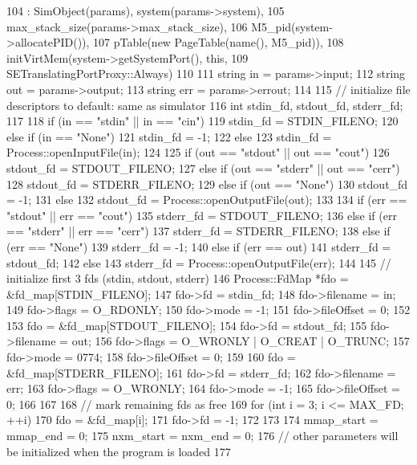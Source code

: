 \begin{DoxyCode}
104     : SimObject(params), system(params->system),
105       max_stack_size(params->max_stack_size),
106       M5_pid(system->allocatePID()),
107       pTable(new PageTable(name(), M5_pid)),
108       initVirtMem(system->getSystemPort(), this,
109                   SETranslatingPortProxy::Always)
110 {
111     string in = params->input;
112     string out = params->output;
113     string err = params->errout;
114 
115     // initialize file descriptors to default: same as simulator
116     int stdin_fd, stdout_fd, stderr_fd;
117 
118     if (in == "stdin" || in == "cin")
119         stdin_fd = STDIN_FILENO;
120     else if (in == "None")
121         stdin_fd = -1;
122     else
123         stdin_fd = Process::openInputFile(in);
124 
125     if (out == "stdout" || out == "cout")
126         stdout_fd = STDOUT_FILENO;
127     else if (out == "stderr" || out == "cerr")
128         stdout_fd = STDERR_FILENO;
129     else if (out == "None")
130         stdout_fd = -1;
131     else
132         stdout_fd = Process::openOutputFile(out);
133 
134     if (err == "stdout" || err == "cout")
135         stderr_fd = STDOUT_FILENO;
136     else if (err == "stderr" || err == "cerr")
137         stderr_fd = STDERR_FILENO;
138     else if (err == "None")
139         stderr_fd = -1;
140     else if (err == out)
141         stderr_fd = stdout_fd;
142     else
143         stderr_fd = Process::openOutputFile(err);
144 
145     // initialize first 3 fds (stdin, stdout, stderr)
146     Process::FdMap *fdo = &fd_map[STDIN_FILENO];
147     fdo->fd = stdin_fd;
148     fdo->filename = in;
149     fdo->flags = O_RDONLY;
150     fdo->mode = -1;
151     fdo->fileOffset = 0;
152 
153     fdo =  &fd_map[STDOUT_FILENO];
154     fdo->fd = stdout_fd;
155     fdo->filename = out;
156     fdo->flags =  O_WRONLY | O_CREAT | O_TRUNC;
157     fdo->mode = 0774;
158     fdo->fileOffset = 0;
159 
160     fdo = &fd_map[STDERR_FILENO];
161     fdo->fd = stderr_fd;
162     fdo->filename = err;
163     fdo->flags = O_WRONLY;
164     fdo->mode = -1;
165     fdo->fileOffset = 0;
166 
167 
168     // mark remaining fds as free
169     for (int i = 3; i <= MAX_FD; ++i) {
170         fdo = &fd_map[i];
171         fdo->fd = -1;
172     }
173 
174     mmap_start = mmap_end = 0;
175     nxm_start = nxm_end = 0;
176     // other parameters will be initialized when the program is loaded
177 }
\end{DoxyCode}


